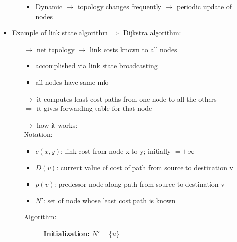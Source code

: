 \begin{itemize}
\begin{itemize}
\begin{itemize}
            \item Dynamic $\rightarrow$ topology changes frequently $\rightarrow$ periodic update of nodes
        \end{itemize}
    \end{itemize}
    \item Example of link state algorithm $\Rightarrow$ Dijkstra algorithm:
    \begin{itemize}
        \item[$\rightarrow$] net topology $\rightarrow$ link costs known to all nodes
        \begin{itemize}
            \item accomplished via link state broadcasting
            \item all nodes have same info
        \end{itemize}
        \item[$\rightarrow$] it computes least cost paths from one node to all the others\\
        $\Rightarrow$ it gives forwarding table for that node
        \item[$\rightarrow$] how it works:\\[0.2cm]
        Notation:
        \begin{itemize}
            \item $c(x,y)$: link cost from node x to y; initially $= + \infty$
            \item $D(v)$: current value of cost of path from source to destination v
            \item $p(v)$: predessor node along path from source to destination v
            \item $N'$: set of node whose least cost path is known
        \end{itemize}
        \newpage
        Algorithm:
        \vspace*{-0.5cm}
        \begin{figure}[!h]
            \centering
            \begin{minipage}{.75\linewidth}
                \begin{algorithm}[H]
                    \captionsetup{labelformat=empty}
                    \begin{algorithmic}[1]
                    \State \textbf{Initialization:}
                    \State $N' = \{u\}$
                        \Else 

\end{algorithmic}
\end{algorithm}
\end{minipage}
\end{figure}
\end{itemize}
\end{itemize}
